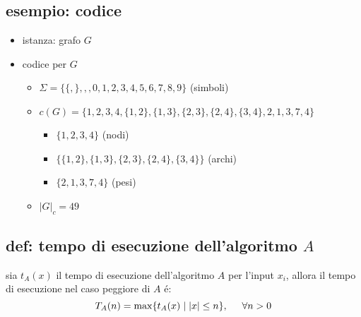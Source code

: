 \subsection*{esempio: codice}
\begin{flushleft}
	\begin{itemize}
		\item istanza: grafo $G$
	\end{itemize}
\end{flushleft}
\begin{center}
\end{center}
\begin{flushleft}
	\begin{itemize}
		\item codice per $G$
		\begin{itemize}
			\item $\Sigma=\{\{,\},,,0,1,2,3,4,5,6,7,8,9\}$ (simboli)
			\item $c(G)=\{1,2,3,4,\{1,2\},\{1,3\},\{2,3\},\{2,4\},\{3,4\},2,1,3,7,4\}$
			\begin{itemize}
				\item $\{1,2,3,4\}$ (nodi)
				\item $\{\{1,2\},\{1,3\},\{2,3\},\{2,4\},\{3,4\}\}$ (archi)
				\item $\{2,1,3,7,4\}$ (pesi)
			\end{itemize}
			\item $|G|_{c}=49$
		\end{itemize}
	\end{itemize}
\end{flushleft}


\subsection*{def: tempo di esecuzione dell'algoritmo $A$}
\begin{flushleft}
	sia $t_{A}(x)$ il tempo di esecuzione dell'algoritmo $A$ per l'input $x_{i}$, allora il tempo di esecuzione nel caso peggiore di $A$ \'e:
	$$T_{A}(n)=\max\{t_{A}(x)\hspace{0.1cm}|\hspace{0.1cm}|x|\leq n\},\hspace{0.5cm}\forall n>0$$
\end{flushleft}

